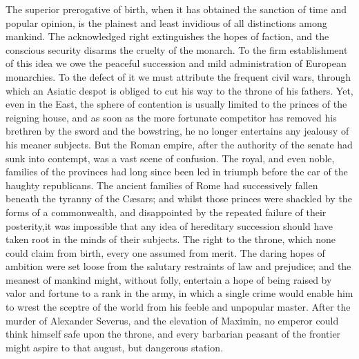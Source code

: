 The superior prerogative of birth, when it has obtained the
sanction of time and popular opinion, is the plainest and least
invidious of all distinctions among mankind. The acknowledged
right extinguishes the hopes of faction, and the conscious
security disarms the cruelty of the monarch. To the firm
establishment of this idea we owe the peaceful succession and
mild administration of European monarchies. To the defect of it
we must attribute the frequent civil wars, through which an
Asiatic despot is obliged to cut his way to the throne of his
fathers. Yet, even in the East, the sphere of contention is
usually limited to the princes of the reigning house, and as soon
as the more fortunate competitor has removed his brethren by the
sword and the bowstring, he no longer entertains any jealousy of
his meaner subjects. But the Roman empire, after the authority of
the senate had sunk into contempt, was a vast scene of confusion.
The royal, and even noble, families of the provinces had long
since been led in triumph before the car of the haughty
republicans. The ancient families of Rome had successively fallen
beneath the tyranny of the Cæsars; and whilst those princes were
shackled by the forms of a commonwealth, and disappointed by the
repeated failure of their posterity,\footnotemark[1] it was impossible that any
idea of hereditary succession should have taken root in the minds
of their subjects. The right to the throne, which none could
claim from birth, every one assumed from merit. The daring hopes
of ambition were set loose from the salutary restraints of law
and prejudice; and the meanest of mankind might, without folly,
entertain a hope of being raised by valor and fortune to a rank
in the army, in which a single crime would enable him to wrest
the sceptre of the world from his feeble and unpopular master.
After the murder of Alexander Severus, and the elevation of
Maximin, no emperor could think himself safe upon the throne, and
every barbarian peasant of the frontier might aspire to that
august, but dangerous station.


